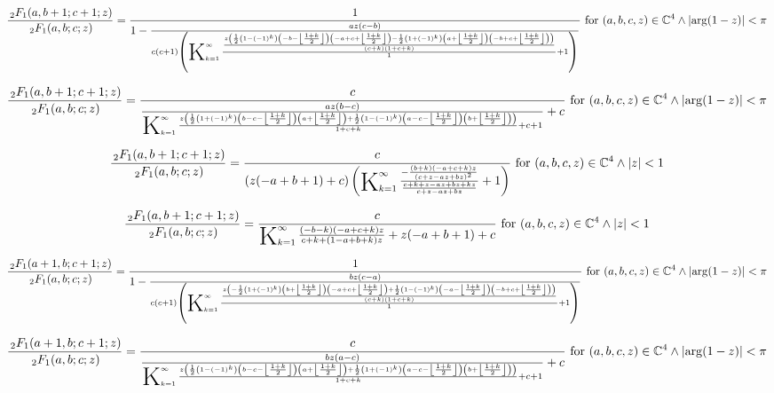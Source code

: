 \documentclass{article}
\newcommand{\bigK}{\mathop{\raisebox{-5pt}{\huge K}}}
\begin{document}
\[\frac{\, _2F_1(a,b+1;c+1;z)}{\, _2F_1(a,b;c;z)}=\frac{1}{1-\frac{a z (c-b)}{c (c+1) \left(\bigK_{k=1}^{\infty}\frac{\frac{z \left(\frac{1}{2} \left(1-(-1)^k\right) \left(-b-\left\lfloor \frac{1+k}{2}\right\rfloor \right) \left(-a+c+\left\lfloor \frac{1+k}{2}\right\rfloor \right)-\frac{1}{2} \left(1+(-1)^k\right) \left(a+\left\lfloor \frac{1+k}{2}\right\rfloor \right) \left(-b+c+\left\lfloor \frac{1+k}{2}\right\rfloor \right)\right)}{(c+k) (1+c+k)}}{1}+1\right)}}\text{ for }(a,b,c,z)\in \mathbb{C}^4\land \left| \arg (1-z)\right| <\pi\] 

\[\frac{\, _2F_1(a,b+1;c+1;z)}{\, _2F_1(a,b;c;z)}=\frac{c}{\frac{a z (b-c)}{\bigK_{k=1}^{\infty}\frac{z \left(\frac{1}{2} \left(1+(-1)^k\right) \left(b-c-\left\lfloor \frac{1+k}{2}\right\rfloor \right) \left(a+\left\lfloor \frac{1+k}{2}\right\rfloor \right)+\frac{1}{2} \left(1-(-1)^k\right) \left(a-c-\left\lfloor \frac{1+k}{2}\right\rfloor \right) \left(b+\left\lfloor \frac{1+k}{2}\right\rfloor \right)\right)}{1+c+k}+c+1}+c}\text{ for }(a,b,c,z)\in \mathbb{C}^4\land \left| \arg (1-z)\right| <\pi\] 

\[\frac{\, _2F_1(a,b+1;c+1;z)}{\, _2F_1(a,b;c;z)}=\frac{c}{(z (-a+b+1)+c) \left(\bigK_{k=1}^{\infty}\frac{-\frac{(b+k) (-a+c+k) z}{(c+z-a z+b z)^2}}{\frac{c+k+z-a z+b z+k z}{c+z-a z+b z}}+1\right)}\text{ for }(a,b,c,z)\in \mathbb{C}^4\land \left| z\right| <1\] 

\[\frac{\, _2F_1(a,b+1;c+1;z)}{\, _2F_1(a,b;c;z)}=\frac{c}{\bigK_{k=1}^{\infty}\frac{(-b-k) (-a+c+k) z}{c+k+(1-a+b+k) z}+z (-a+b+1)+c}\text{ for }(a,b,c,z)\in \mathbb{C}^4\land \left| z\right| <1\] 

\[\frac{\, _2F_1(a+1,b;c+1;z)}{\, _2F_1(a,b;c;z)}=\frac{1}{1-\frac{b z (c-a)}{c (c+1) \left(\bigK_{k=1}^{\infty}\frac{\frac{z \left(-\frac{1}{2} \left(1+(-1)^k\right) \left(b+\left\lfloor \frac{1+k}{2}\right\rfloor \right) \left(-a+c+\left\lfloor \frac{1+k}{2}\right\rfloor \right)+\frac{1}{2} \left(1-(-1)^k\right) \left(-a-\left\lfloor \frac{1+k}{2}\right\rfloor \right) \left(-b+c+\left\lfloor \frac{1+k}{2}\right\rfloor \right)\right)}{(c+k) (1+c+k)}}{1}+1\right)}}\text{ for }(a,b,c,z)\in \mathbb{C}^4\land \left| \arg (1-z)\right| <\pi\] 

\[\frac{\, _2F_1(a+1,b;c+1;z)}{\, _2F_1(a,b;c;z)}=\frac{c}{\frac{b z (a-c)}{\bigK_{k=1}^{\infty}\frac{z \left(\frac{1}{2} \left(1-(-1)^k\right) \left(b-c-\left\lfloor \frac{1+k}{2}\right\rfloor \right) \left(a+\left\lfloor \frac{1+k}{2}\right\rfloor \right)+\frac{1}{2} \left(1+(-1)^k\right) \left(a-c-\left\lfloor \frac{1+k}{2}\right\rfloor \right) \left(b+\left\lfloor \frac{1+k}{2}\right\rfloor \right)\right)}{1+c+k}+c+1}+c}\text{ for }(a,b,c,z)\in \mathbb{C}^4\land \left| \arg (1-z)\right| <\pi\] 
\end{document}
